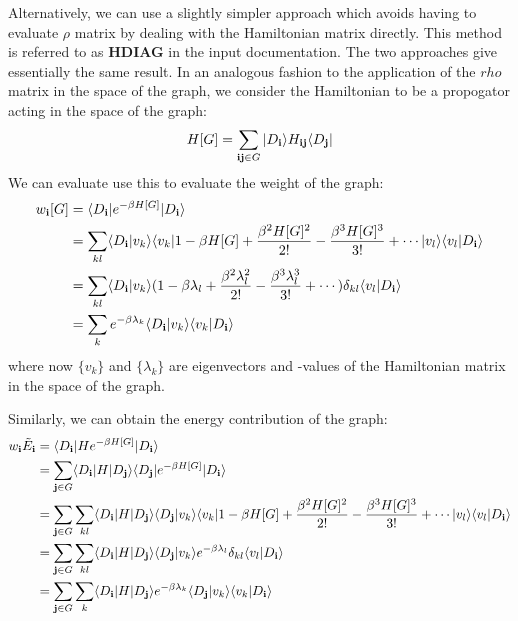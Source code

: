 \documentclass[openany,a4paper,10pt,english]{manual}
\newcommand{\bra}{\ensuremath{\langle}}
\newcommand{\ket}{\ensuremath{\rangle}}
\newcommand{\veci}{\ensuremath{\mathbf{i}}}
\newcommand{\vecj}{\ensuremath{\mathbf{j}}}
\begin{document}
Alternatively, we can use a slightly simpler approach which avoids having to evaluate
$\rho$ matrix by dealing with the Hamiltonian matrix directly.  This method is referred
to as \textbf{HDIAG} in the input documentation.  The two approaches give
essentially the same result.  In an analogous fashion to the application
of the $rho$ matrix in the space of the graph, we consider the Hamiltonian to be a propogator
acting in the space of the graph:
\begin{gather}
\begin{split}H[G] = \sum_{\veci\vecj \in G} |D_\veci \ket H_{\veci\vecj}\bra D_\vecj|\end{split}\notag
\end{gather}
We can evaluate use this to evaluate the weight of the graph:
\begin{gather}
\begin{split}w_{\veci}[G] & = \bra D_{\veci} | e^{-\beta H[G]} | D_{\veci} \ket \\
             & = \sum_{kl} \bra D_{\veci} | v_k \ket \bra v_k | 1 - \beta H[G] + \frac{\beta^2 H[G]^2}{2!} - \frac{\beta^3 H[G]^3}{3!} + \cdots | v_l \ket \bra v_l | D_{\veci} \ket \\
             & = \sum_{kl} \bra D_{\veci} | v_k \ket (1 - \beta\lambda_l + \frac{\beta^2\lambda_l^2}{2!} - \frac{\beta^3\lambda_l^3}{3!} + \cdots) \delta_{kl} \bra v_l | D_{\veci} \ket \\
             & =  \sum_k e^{-\beta\lambda_k} \bra D_{\veci} | v_k \ket \bra v_k | D_{\veci} \ket\end{split}\notag
\end{gather}
where now $\{v_k\}$ and $\{\lambda_k\}$ are eigenvectors and
-values of the Hamiltonian matrix in the space of the graph.

Similarly, we can obtain the energy contribution of the graph:
\begin{gather}
\begin{split}w_{\veci}\tilde{E}_{\veci} & = \bra D_{\veci} | H e^{-\beta H[G]} | D_{\veci} \ket \\
                           & = \sum_{\vecj \in G} \bra D_{\veci} | H | D_{\vecj} \ket \bra D_{\vecj} | e^{-\beta H[G]} | D_{\veci} \ket \\
                           & = \sum_{\vecj \in G} \sum_{kl} \bra D_{\veci} | H | D_{\vecj} \ket \bra D_{\vecj} | v_k \ket \bra v_k | 1 - \beta H[G] + \frac{\beta^2 H[G]^2}{2!} - \frac{\beta^3 H[G]^3}{3!} + \cdots  | v_l \ket \bra v_l | D_{\veci} \ket \\
                           & = \sum_{\vecj \in G} \sum_{kl}  \bra D_{\veci} | H | D_{\vecj} \ket \bra D_{\vecj} | v_k \ket e^{-\beta\lambda_l} \delta_{kl} \bra v_l | D_{\veci} \ket \\
                           & = \sum_{\vecj \in G} \sum_{k} \bra D_{\veci} | H | D_{\vecj} \ket e^{-\beta\lambda_k} \bra D_{\vecj} | v_k \ket \bra v_k | D_{\veci} \ket\end{split}\notag
\end{gather}
\resetcurrentobjects
\hypertarget{--doc-installation}{}
\end{document}
